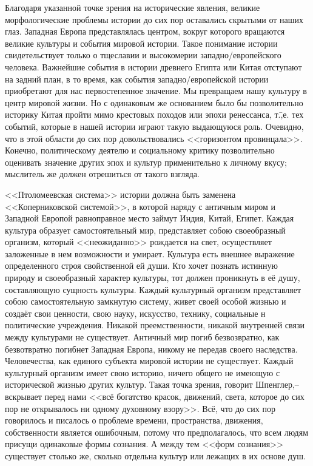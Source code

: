 Благодаря указанной точке зрения на исторические явления, великие морфологические проблемы истории до сих пор оставались скрытыми от наших глаз. Западная Европа представлялась центром, вокруг которого вращаются великие культуры и события мировой истории. Такое понимание истории свидетельствует только о тщеславии и высокомерии западно\-/европейского человека. Важнейшие события в истории древнего Египта или Китая отступают на задний план, в то время, как события западно\-/европейской истории приобретают для нас первостепенное значение. Мы превращаем нашу культуру в центр мировой жизни. Но с одинаковым же основанием было бы позволительно историку Китая пройти мимо крестовых походов или эпохи ренессанса, т.\=,е. тех событий, которые в нашей истории играют такую выдающуюся роль. Очевидно, что в этой области до сих пор довольствовались <<горизонтом провинцала>>. Конечно, политическому деятелю и социальному критику позволительно оценивать значение других эпох и культур применительно к личному вкусу; мыслитель же должен отрешиться от такого взгляда.

<<Птоломеевская система>> истории должна быть заменена <<Коперниковской системой>>, в которой наряду с античным миром и Западной Европой равноправное место займут Индия, Китай, Египет. Каждая культура образует самостоятельный мир, представляет собою своеобразный организм, который <<неожиданно>> рождается на свет, осуществляет заложенные в нем возможности и умирает. Культура есть внешнее выражение определенного строя свойственной ей души. Кто хочет познать истинную природу и своеобразный характер культуры, тот должен проникнуть в её душу, составляющую сущность культуры. Каждый культурный организм представляет собою самостоятельную замкнутую систему, живет своей особой жизнью и создаёт свои ценности, свою науку, искусство, технику, социальные н политические учреждения. Никакой преемственности, никакой внутренней связи между культурами не существует. Античный мир погиб безвозвратно, как безвотвратно погибнет Западная Европа, никому не передав своего наследства. Человечества, как единого субъекта мировой истории не существует. Каждый культурный организм имеет свою историю, ничего общего не имеющую с исторической жизнью других культур. Такая точка зрения, говорит Шпенглер,\---вскрывает перед нами <<всё богатство красок, движений, света, которое до сих пор не открывалось ни одному духовному взору>>. Всё, что до сих пор говорилось и писалось о проблеме времени, пространства, движения, собственности является ошибочным, потому что предполагалось, что всем людям присущи одинаковые формы сознания. А между тем <<форм сознания>> существует столько же, сколько отдельна культур или лежащих в их основе душ.

